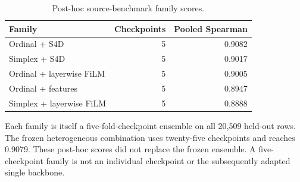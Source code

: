 \begin{table}[htbp]
\centering\small
\caption{Post-hoc source-benchmark family scores.}
\label{tab:sourcemembers}
\begin{tabular}{lrr}
\toprule
Family & Checkpoints & Pooled Spearman \\
\midrule
Ordinal + S4D & 5 & 0.9082 \\
Simplex + S4D & 5 & 0.9017 \\
Ordinal + layerwise FiLM & 5 & 0.9005 \\
Ordinal + features & 5 & 0.8947 \\
Simplex + layerwise FiLM & 5 & 0.8888 \\
\bottomrule
\end{tabular}
\par\smallskip
\begin{minipage}{\linewidth}\footnotesize Each family is itself a five-fold-checkpoint ensemble on all 20,509 held-out rows. The frozen heterogeneous combination uses twenty-five checkpoints and reaches 0.9079. These post-hoc scores did not replace the frozen ensemble. A five-checkpoint family is not an individual checkpoint or the subsequently adapted single backbone.\end{minipage}
\end{table}
